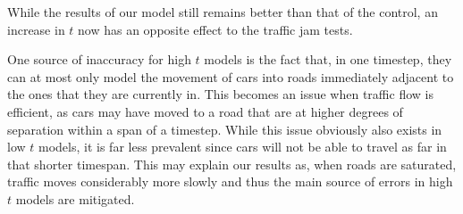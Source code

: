 \documentclass[a4paper]{article}
\begin{document}
While the results of our model still remains better than that of the control, an increase in $t$ now has an opposite effect to the traffic jam tests.

One source of inaccuracy for high $t$ models is the fact that, in one timestep, they can at most only model the movement of cars into roads immediately adjacent to the ones
that they are currently in.
This becomes an issue when traffic flow is efficient, as cars may have moved to a road that are at higher degrees of separation within a span of a timestep.
While this issue obviously also exists in low $t$ models, it is far less prevalent since cars will not be able to travel as far in that shorter timespan.
This may explain our results as, when roads are saturated, traffic moves considerably more slowly and thus the main source of errors in high $t$ models are mitigated.

\printbibliography
\end{document}
